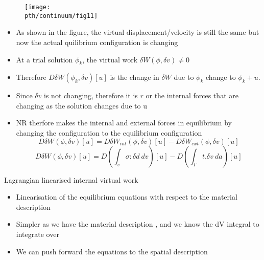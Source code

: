	\begin{frame}
		\begin{figure}
			\centering
			\texttt{[image: \\pth/continuum/fig11]}
		\end{figure}
		\begin{itemize}
			\item As shown in the figure, the virtual displacement/velocity is still the same but now the actual quilibrium configuration is changing
			\item At a trial solution $\phi_k$, the virtual work $\delta W(\phi,\delta v) \neq 0$
			
			\item Therefore $D\delta W(\phi_k,\delta v)[u]$ is the change in $ \delta W$ due to $\phi_k$ change to $\phi_k + u$. 
			
			\item Since $\delta v $ is not changing, therefore it is $r$ or the internal forces that are changing as the solution changes due to u
			
			\item NR therfore makes the internal and external forces in equilibrium by changing the configuration to the equilibrium configuration
			\begin{equation}
				D\delta W(\phi, \delta v)[u] = D\delta W_{int}(\phi,\delta v)[u] - D \delta W_{ext}(\phi,\delta v)[u]
			\end{equation}
			\begin{equation}
			D\delta W(\phi, \delta v)[u] = D \left(\int_v \sigma : \delta d~ dv  \right)[u] - D \left( \int_{\Gamma} t.\delta v ~da \right)[u]
			\end{equation}			
		\end{itemize}
	\end{frame}


	\begin{frame}{Lagrangian linearised internal virtual work}
		\begin{itemize}
			\item Linearisation of the equilibrium equations with respect to the material description
			\item Simpler as we have the material description , and we know the dV integral to integrate over
			\item We can push forward the equations to the spatial description
			
			
		\end{itemize}
	\end{frame}

